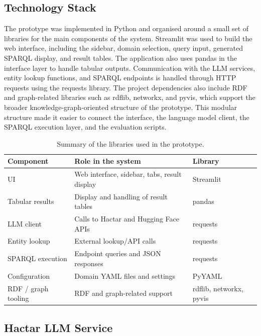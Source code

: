 \documentclass[11pt,a4paper]{article}
\begin{document}
\subsection{Technology Stack}
\label{sec:stack}
The prototype was implemented in Python and organised around a small set of libraries for the main components of the system. Streamlit was used to build the web interface, including the sidebar, domain selection, query input, generated SPARQL display, and result tables. The application also uses pandas in the interface layer to handle tabular outputs. Communication with the LLM services, entity lookup functions, and SPARQL endpoints is handled through HTTP requests using the requests library. The project dependencies also include RDF and graph-related libraries such as rdflib, networkx, and pyvis, which support the broader knowledge-graph-oriented structure of the prototype. This modular structure made it easier to connect the interface, the language model client, the SPARQL execution layer, and the evaluation scripts.

\begin{table}[h]
    \centering
    \begin{tabular}{lll}
    \hline
    \textbf{Component} & \textbf{Role in the system} & \textbf{Library} \\
    \hline
    UI & Web interface, sidebar, tabs, result display & Streamlit \\
    Tabular results & Display and handling of result tables & pandas \\
    LLM client & Calls to Hactar and Hugging Face APIs & requests \\
    Entity lookup & External lookup/API calls & requests \\
    SPARQL execution & Endpoint queries and JSON responses & requests \\
    Configuration & Domain YAML files and settings & PyYAML \\
    RDF / graph tooling & RDF and graph-related support & rdflib, networkx, pyvis \\
    \hline
    \end{tabular}
    \caption{Summary of the libraries used in the prototype.}
    \label{tab:tech-stack}
    \end{table}

\subsection{Hactar LLM Service}
\label{sec:hactar}
\end{document}
